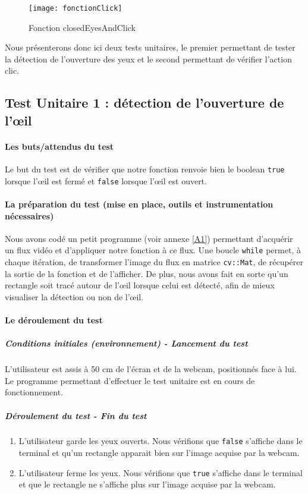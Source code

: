 \begin{figure}[H]
  \centering
  \texttt{[image: fonctionClick]}
  \caption{Fonction closedEyesAndClick}
  \label{fig:CEAC}
\end{figure}

Nous présenterons donc ici deux tests unitaires, le premier permettant de tester la détection de l’ouverture des yeux et le second permettant de vérifier l’action clic.

\subsection{Test Unitaire 1 : détection de l’ouverture de l’œil}

\paragraph{Les buts/attendus du test}

Le but du test est de vérifier que notre fonction renvoie bien le boolean \lstinline=true= lorsque l’œil est fermé et \lstinline=false= lorsque l’œil est ouvert. 

\paragraph{La préparation du test (mise en place, outils et instrumentation nécessaires)}

Nous avons codé un petit programme (voir annexe \ref{A1}) permettant d’acquérir un flux vidéo et d’appliquer notre fonction à ce flux. Une boucle \lstinline=while= permet, à chaque itération, de transformer l’image du flux en matrice \lstinline=cv::Mat=, de récupérer la sortie de la fonction et de l'afficher. De plus, nous avons fait en sorte qu’un rectangle soit tracé autour de l’œil lorsque celui est détecté, afin de mieux visualiser la détection ou non de l’œil.

\paragraph{Le déroulement du test}

\subparagraph{Conditions initiales (environnement) - Lancement du test}
L’utilisateur est assis à 50 cm de l’écran et de la webcam, positionnés face à lui. Le programme permettant d’effectuer le test unitaire est en cours de fonctionnement.

\subparagraph{Déroulement du test - Fin du test}

\begin{enumerate}
\item L’utilisateur garde les yeux ouverts. Nous vérifions que \lstinline=false= s’affiche dans le terminal et qu’un rectangle apparait bien sur l’image acquise par la webcam.
\item L’utilisateur ferme les yeux. Nous vérifions que \lstinline=true= s’affiche dans le terminal et que le rectangle ne s’affiche plus sur l’image acquise par la webcam.
\end{enumerate}

